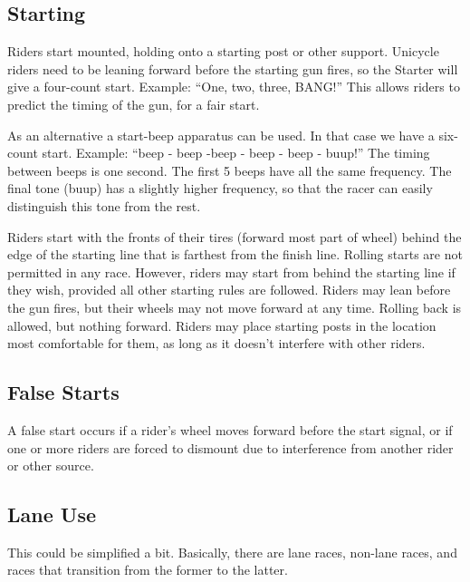 \subsection{Starting}

Riders start mounted, holding onto a starting post or other support.
Unicycle riders need to be leaning forward before the starting gun fires, so the Starter will give a four-count start.
Example: ``One, two, three, BANG!''
This allows riders to predict the timing of the gun, for a fair start.

As an alternative a start-beep apparatus can be used.
In that case we have a six-count start.
Example: ``beep - beep -beep - beep - beep - buup!''
The timing between beeps is one second.
The first 5 beeps have all the same frequency.
The final tone (buup) has a slightly higher frequency, so that the racer can easily distinguish this tone from the rest.

Riders start with the fronts of their tires (forward most part of wheel) behind the edge of the starting line that is farthest from the finish line.
Rolling starts are not permitted in any race.
However, riders may start from behind the starting line if they wish, provided all other starting rules are followed.
Riders may lean before the gun fires, but their wheels may not move forward at any time.
Rolling back is allowed, but nothing forward.
Riders may place starting posts in the location most comfortable for them, as long as it doesn't interfere with other riders.

\subsection{False Starts}

A false start occurs if a rider's wheel moves forward before the start signal, or if one or more riders are forced to dismount due to interference from another rider or other source.

\subsection{Lane Use}

\begin{comment2016}
This could be simplified a bit.
Basically, there are lane races, non-lane races, and races that transition from the former to the latter.
\end{comment2016}

